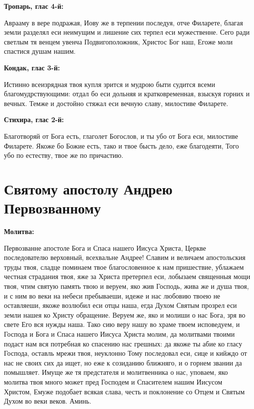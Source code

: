 \bfseries Тропарь, глас 4-й:\normalfont{}


Аврааму в вере подражая, Иову же в терпении последуя, отче Филарете, благая земли разделял еси неимущим и лишение сих терпел еси мужественне. Сего ради светлым тя венцем увенча Подвигоположник, Христос Бог наш, Егоже моли спастися душам нашим.


\medskip
\bfseries Кондак, глас 3-й:\normalfont{}\nopagebreak

Истинно всеизрядная твоя купля зрится и мудрою быти судится всеми благомудрствующими: отдал бо еси дольняя и кратковременная, взыскуя горних и вечных. Темже и достойно стяжал еси вечную славу, милостиве Филарете.


\medskip
\bfseries Стихира, глас 2-й:\normalfont{}\nopagebreak


Благотворяй от Бога есть, глаголет Богослов, и ты убо от Бога еси, милостиве Филарете. Якоже бо Божие есть, тако и твое бысть дело, еже благодеяти, Того убо по естеству, твое же по причастию.

 



\section{Святому апостолу Андрею Первозванному}
 
\bfseries Молитва:\normalfont{}\nopagebreak


Первозванне апостоле Бога и Спаса нашего Иисуса Христа, Церкве последователю верховный, всехвальне Андрее! Славим и величаем апостольския труды твоя, сладце поминаем твое благословенное к нам пришествие, ублажаем честная страдания твоя, яже за Христа претерпел еси, лобызаем священныя мощи твоя, чтим святую память твою и веруем, яко жив Господь, жива же и душа твоя, и с ним во веки на небеси пребываеши, идеже и нас любовию твоею не оставляеши, якоже возлюбил еси отцы наша, егда Духом Святым прозрел еси земли нашея ко Христу обращение. Веруем же, яко и молиши о нас Бога, зря во свете Его вся нужды наша. Тако сию веру нашу во храме твоем исповедуем, и Господа и Бога и Спаса нашего Иисуса Христа молим, да молитвами твоими подаст нам вся потребная ко спасению нас грешных: да якоже ты абие ко гласу Господа, оставль мрежи твоя, неуклонно Тому последовал еси, сице и кийждо от нас не своих сих да ищет, но еже к созиданию ближняго, и о горнем звании да помышляет. Имуще же тя предстателя и молитвенника о нас, уповаем, яко молитва твоя много может пред Господем и Спасителем нашим Иисусом Христом, Емуже подобает всякая слава, честь и поклонение со Отцем и Святым Духом во веки веков. Аминь. 



